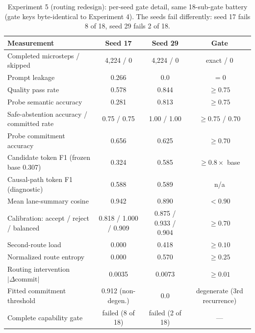 \documentclass[10pt,a4paper]{article}
\newcommand{\fail}[1]{\textcolor{failred}{#1}}
\newcommand{\good}[1]{\textcolor{okgreen}{#1}}
\begin{document}
\begin{table}[htbp]
\caption{Experiment 5 (routing redesign): per-seed gate detail, same 18-sub-gate battery (gate keys byte-identical to Experiment 4). The seeds fail differently: seed 17 fails 8 of 18, seed 29 fails 2 of 18.}
\label{tab:gates-exp5}
\centering\footnotesize
\begin{tabularx}{\textwidth}{@{}Xccc@{}}
\toprule
Measurement & Seed 17 & Seed 29 & Gate \\
\midrule
Completed microsteps / skipped & 4,224 / 0 & 4,224 / 0 & exact / 0 \\
Prompt leakage & \fail{0.266} & 0.0 & $= 0$ \\
Quality pass rate & \fail{0.578} & 0.844 & $\geq 0.75$ \\
Probe semantic accuracy & \fail{0.281} & 0.813 & $\geq 0.75$ \\
Safe-abstention accuracy / committed rate & 0.75 / 0.75 & 1.00 / 1.00 & $\geq 0.75$ / $0.70$ \\
Probe commitment accuracy & \fail{0.656} & \fail{0.625} & $\geq 0.70$ \\
Candidate token F1 (frozen base 0.307) & 0.324 & 0.585 & $\geq 0.8\times$ base \\
Causal-path token F1 (diagnostic) & 0.588 & 0.589 & n/a \\
Mean lane-summary cosine & \fail{0.942} & 0.890 & $< 0.90$ \\
Calibration: accept / reject / balanced & 0.818 / 1.000 / 0.909 & 0.875 / 0.933 / 0.904 & $\geq 0.70$ \\
Second-route load & \fail{0.000} & \good{0.418} & $\geq 0.10$ \\
Normalized route entropy & \fail{0.000} & \good{0.570} & $\geq 0.25$ \\
Routing intervention $|\Delta \text{commit}|$ & \fail{0.0035} & \fail{0.0073} & $\geq 0.01$ \\
Fitted commitment threshold & 0.912 (non-degen.) & 0.0 & degenerate (3rd recurrence) \\
Complete capability gate & \fail{failed (8 of 18)} & \fail{failed (2 of 18)} & --- \\
\bottomrule
\end{tabularx}
\end{table}
\end{document}
